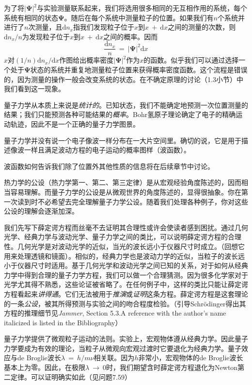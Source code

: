 \documentclass[12pt,a4paper,openany]{ctexbook}
\begin{document}
\begin{flushleft}
为了将$\left|\bm{\Psi}\right|^2$与实验测量联系起来，我们将选用很多相同的无互相作用的系统，每个系统有相同的状态$\bm{\Psi}$。随后在每个系统中测量粒子的位置。如果我们有$n$个系统并进行了$n$次测量，且$\mathrm{d}n_x$指我们发现粒子位于$x$到$x\ +\ \mathrm{d}x$之间的测量的次数，则$\mathrm{d}n_x/n$为发现粒子位于$x$到$x\ +\ \mathrm{d}x$之间的概率。因而
\begin{equation*}
    \frac{\mathrm{d}n_x}{n}\ =\ \left|\bm{\Psi}\right|^2\mathrm{d}x
\end{equation*}
$x$对$(1/n)\mathrm{d}n_x/\mathrm{d}x$作图给出概率密度$\left|\bm{\Psi}\right|^2$作为$x$的函数。似乎我们可以通过选择一个处于$\bm{\Psi}$状态的系统并重复地测量粒子位置来获得概率密度函数。这个流程是错误的，因为测量的操作一般会改变系统的状态。在不确定原理的讨论（1.3小节）中我们看到这一现象。

量子力学从本质上来说是\textit{统计的}。已知状态，我们不能确定地预测一次位置测量的结果；我们只能预测各种可能结果的\textit{概率}。Bohr氢原子理论确定了电子的精确运动轨迹，因此不是一个正确的量子力学图景。

量子力学并没有说一个电子像波一样分布在一大片空间里。确切的说，它是用于描述像波一样且满足波动方程的电子运动的概率图样（波函数）。

波函数如何告诉我们除了位置外其他性质的信息将在后续章节中讨论。

热力学的公设（热力学第一、第二、第三定律）是从宏观经验角度陈述的，因而相当容易理解。而量子力学的公设是从微观世界的角度陈述的，显得很抽象。你在第一次读到时不必希望去完全理解量子力学公设。随着我们处理各种例子，你对这些公设的理解会逐渐加深。

我们先写下薛定谔方程而丝毫不去证明其合理性或许会使读者感到困扰。通过几何光学、经典力学与波动光学、量子力学之间的类比，可以说明薛定谔方程的合理性。几何光学是对波动光学的近似，当光的波长远小于仪器尺寸时成立。（回想它用来处理透镜和镜面）。相似的，经典力学也是波动力学的近似，当粒子的波长远小于仪器尺寸时适用。基于几何光学和波动光学之间已知的关系，对于如何从经典力学中得到合理的量子力学方程，我们可以做一个合理猜测。因为很多化学家对于光学尤其得不熟悉，这些论证被省略了。在任何例子中，这样的类比只能让薛定谔方程看起来\textit{讲得通}。它们无法被用于\textit{推演}或\textit{证明}这条方程。薛定谔方程是这套理论的一条\textit{公设}，被其所得预测与实验之间的吻合程度检验。（引导Schr\"odinger得出其方程的推理细节见\textit{Jammer}, Section 5.3.A reference with the author’s name italicized is listed in the Bibliography）

量子力学提供了微观粒子运动的法则。实验上，宏观物体遵从经典力学。因此量子力学要成为有效的理论，当粒子从微观向宏观过渡时它要退化为经典力学。量子效应与de Broglie波长$\lambda\ =\ h/m\nu$相关联。因为$h$非常小，宏观物体的de Broglie波长基本上为零。因此，在极限$\lambda\ \to\ 0$时，我们期望含时薛定谔方程退化为Newton第二定律。可以证明确实如此（见问题7.59）


\end{flushleft}
\end{document}

